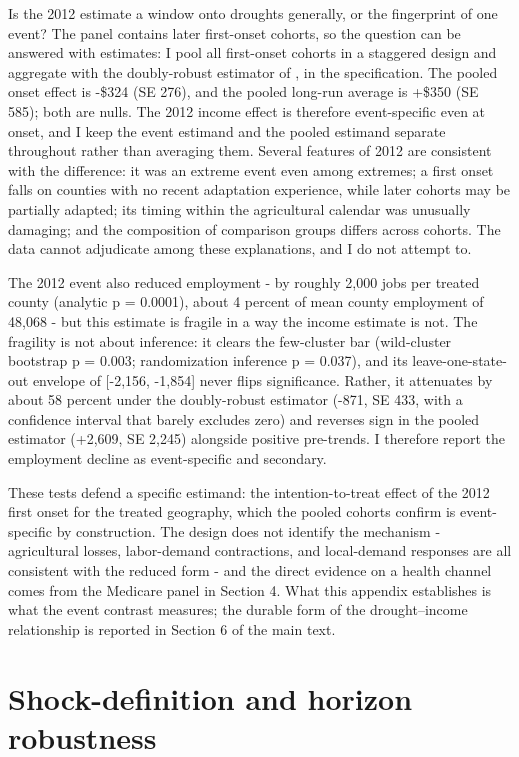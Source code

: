 \documentclass[a4paper,11pt]{report}
\begin{document}
Is the 2012 estimate a window onto droughts generally, or the fingerprint of one event? The panel contains later first-onset cohorts, so the question can be answered with estimates: I pool all first-onset cohorts in a staggered design and aggregate with the doubly-robust estimator of \citet{callaway2021did}, in the \citet{santanna2020drdid} specification. The pooled onset effect is -\$324 (SE 276), and the pooled long-run average is +\$350 (SE 585); both are nulls. The 2012 income effect is therefore event-specific even at onset, and I keep the event estimand and the pooled estimand separate throughout rather than averaging them. Several features of 2012 are consistent with the difference: it was an extreme event even among extremes; a first onset falls on counties with no recent adaptation experience, while later cohorts may be partially adapted; its timing within the agricultural calendar was unusually damaging; and the composition of comparison groups differs across cohorts. The data cannot adjudicate among these explanations, and I do not attempt to.

The 2012 event also reduced employment - by roughly 2,000 jobs per treated county (analytic p = 0.0001), about 4 percent of mean county employment of 48,068 - but this estimate is fragile in a way the income estimate is not. The fragility is not about inference: it clears the few-cluster bar (wild-cluster bootstrap p = 0.003; randomization inference p = 0.037), and its leave-one-state-out envelope of [-2,156, -1,854] never flips significance. Rather, it attenuates by about 58 percent under the doubly-robust estimator (-871, SE 433, with a confidence interval that barely excludes zero) and reverses sign in the pooled estimator (+2,609, SE 2,245) alongside positive pre-trends. I therefore report the employment decline as event-specific and secondary.

These tests defend a specific estimand: the intention-to-treat effect of the 2012 first onset for the treated geography, which the pooled cohorts confirm is event-specific by construction. The design does not identify the mechanism - agricultural losses, labor-demand contractions, and local-demand responses are all consistent with the reduced form - and the direct evidence on a health channel comes from the Medicare panel in Section 4. What this appendix establishes is what the event contrast measures; the durable form of the drought--income relationship is reported in Section 6 of the main text.

\FloatBarrier
\section{Shock-definition and horizon robustness}
\end{document}

